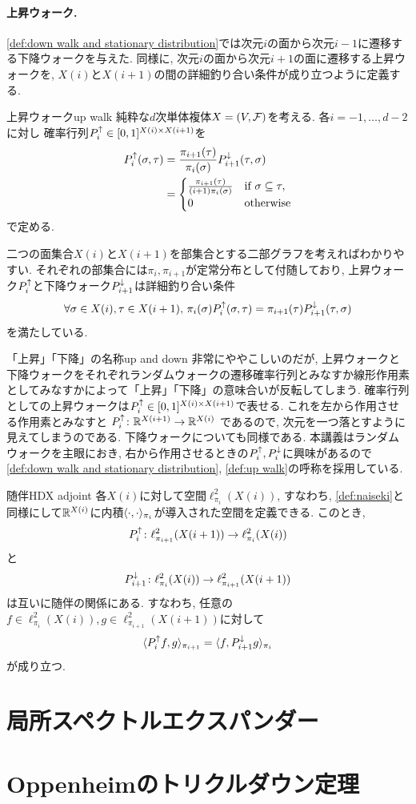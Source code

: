 \paragraph*{上昇ウォーク.}
\cref{def:down walk and stationary distribution}では次元$i$の面から次元$i-1$に遷移する下降ウォークを与えた.
同様に, 次元$i$の面から次元$i+1$の面に遷移する上昇ウォークを, $X(i)$と$X(i+1)$の間の詳細釣り合い条件が成り立つように定義する.
%
\begin{definition}{上昇ウォーク}{up walk}
    純粋な$d$次単体複体$X=(V,\mathcal{F})$を考える.
    各$i=-1,\dots,d-2$に対し
        確率行列$P^{\uparrow}_i \in [0,1]^{X(i) \times X(i+1)}$を
    \begin{align*}
        P^{\uparrow}_i(\sigma,\tau) &= \frac{\pi_{i+1}(\tau)}{\pi_i(\sigma)}P^{\downarrow}_{i+1}(\tau,\sigma) \\
        &= \begin{cases}
            \frac{\pi_{i+1}(\tau)}{(i+1)\pi_i(\sigma)}	& \text{if } \sigma\subseteq \tau,\\
            0 & \text{otherwise}
        \end{cases}
    \end{align*}
    で定める.
\end{definition}
%
二つの面集合$X(i)$と$X(i+1)$を部集合とする二部グラフを考えればわかりやすい.
それぞれの部集合には$\pi_i,\pi_{i+1}$が定常分布として付随しており,
上昇ウォーク$P^{\uparrow}_i$と下降ウォーク$P^{\downarrow}_{i+1}$は詳細釣り合い条件
\[
    \forall \sigma\in X(i),\tau\in X(i+1),\,\pi_i(\sigma)P^{\uparrow}_i(\sigma,\tau) = \pi_{i+1}(\tau)P^{\downarrow}_{i+1}(\tau,\sigma)
\]
を満たしている.
%
\begin{remark}{「上昇」「下降」の名称}{up and down}
    非常にややこしいのだが,
    上昇ウォークと下降ウォークをそれぞれランダムウォークの遷移確率行列とみなすか線形作用素としてみなすかによって「上昇」「下降」の意味合いが反転してしまう.
    確率行列としての上昇ウォークは$P^{\uparrow}_i \in [0,1]^{X(i)\times X(i+1)}$で表せる.
    これを左から作用させる作用素とみなすと
    $P^{\uparrow}_i\colon \mathbb{R}^{X(i+1)} \to \mathbb{R}^{X(i)}$
    であるので, 次元を一つ落とすように見えてしまうのである.
    下降ウォークについても同様である.
    本講義はランダムウォークを主眼におき, 右から作用させるときの$P^{\uparrow}_i,P^{\downarrow}_i$に興味があるので\cref{def:down walk and stationary distribution}, \cref{def:up walk}の呼称を採用している.
\end{remark}
\begin{remark}{随伴}{HDX adjoint}
    各$X(i)$に対して空間$\ell^2_{\pi_i}(X(i))$, 
    すなわち, \cref{def:naiseki}と同様にして$\mathbb{R}^{X(i)}$に内積$\langle\cdot,\cdot\rangle_{\pi_i}$が導入された空間を定義できる.
    このとき, 
    \[P^{\uparrow}_i\colon \ell^2_{\pi_{i+1}}(X(i+1)) \to \ell^2_{\pi_{i}}(X(i))\]
    と
    \[P^{\downarrow}_{i+1}\colon \ell^2_{\pi_{i}}(X(i)) \to \ell^2_{\pi_{i+1}}(X(i+1))\]
    は互いに随伴の関係にある.
    すなわち, 任意の$f\in \ell^2_{\pi_i}(X(i)),g\in \ell^2_{\pi_{i+1}}(X(i+1))$に対して
    \[ \langle P^{\uparrow}_i f, g\rangle_{\pi_{i+1}} = \langle f,P^{\downarrow}_{i+1}g \rangle_{\pi_i} \]
    が成り立つ.
\end{remark}
%


\section{局所スペクトルエクスパンダー}

\section{Oppenheimのトリクルダウン定理}
